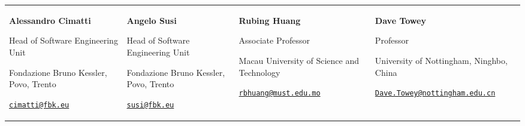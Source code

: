 

\begin{tabularx}{\textwidth}{@{}X X@{}}
\textbf{Alessandro Cimatti}\par
Head of Software Engineering Unit\par
Fondazione Bruno Kessler, Povo, Trento \par
{}
    {\href{mailto:cimatti@fbk.eu}{\texttt{cimatti@fbk.eu}}}
&
\textbf{Angelo Susi}\par
Head of Software Engineering Unit\par
Fondazione Bruno Kessler, Povo, Trento \par
{}
    {\href{mailto:susi@fbk.eu}{\texttt{susi@fbk.eu}}}
&
\textbf{Rubing Huang}\par
Associate Professor\par 
Macau University of Science and Technology\par 
{}
    {\href{mailto:rbhuang@must.edu.mo}{\texttt{rbhuang@must.edu.mo}}}
& 
\textbf{Dave Towey}\par
Professor \par University of Nottingham, Ninghbo, China\par 
{}
    {\href{mailto:Dave.Towey@nottingham.edu.cn}{\texttt{Dave.Towey@nottingham.edu.cn}}}

\end{tabularx}
